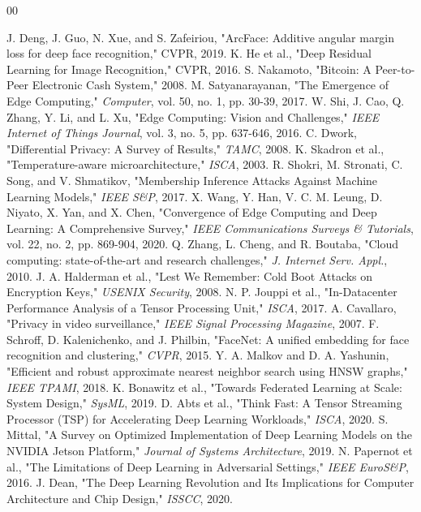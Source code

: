 \documentclass[conference]{IEEEtran}
\begin{document}
\begin{thebibliography}{00}

 J. Deng, J. Guo, N. Xue, and S. Zafeiriou, "ArcFace: Additive angular margin loss for deep face recognition," CVPR, 2019.
 K. He et al., "Deep Residual Learning for Image Recognition," CVPR, 2016.
 S. Nakamoto, "Bitcoin: A Peer-to-Peer Electronic Cash System," 2008.
 M. Satyanarayanan, "The Emergence of Edge Computing," \textit{Computer}, vol. 50, no. 1, pp. 30-39, 2017.
 W. Shi, J. Cao, Q. Zhang, Y. Li, and L. Xu, "Edge Computing: Vision and Challenges," \textit{IEEE Internet of Things Journal}, vol. 3, no. 5, pp. 637-646, 2016.
 C. Dwork, "Differential Privacy: A Survey of Results," \textit{TAMC}, 2008.
 K. Skadron et al., "Temperature-aware microarchitecture," \textit{ISCA}, 2003.
 R. Shokri, M. Stronati, C. Song, and V. Shmatikov, "Membership Inference Attacks Against Machine Learning Models," \textit{IEEE S\&P}, 2017.
 X. Wang, Y. Han, V. C. M. Leung, D. Niyato, X. Yan, and X. Chen, "Convergence of Edge Computing and Deep Learning: A Comprehensive Survey," \textit{IEEE Communications Surveys \& Tutorials}, vol. 22, no. 2, pp. 869-904, 2020.
 Q. Zhang, L. Cheng, and R. Boutaba, "Cloud computing: state-of-the-art and research challenges," \textit{J. Internet Serv. Appl.}, 2010.
 J. A. Halderman et al., "Lest We Remember: Cold Boot Attacks on Encryption Keys," \textit{USENIX Security}, 2008.
 N. P. Jouppi et al., "In-Datacenter Performance Analysis of a Tensor Processing Unit," \textit{ISCA}, 2017.
 A. Cavallaro, "Privacy in video surveillance," \textit{IEEE Signal Processing Magazine}, 2007.
 F. Schroff, D. Kalenichenko, and J. Philbin, "FaceNet: A unified embedding for face recognition and clustering," \textit{CVPR}, 2015.
 Y. A. Malkov and D. A. Yashunin, "Efficient and robust approximate nearest neighbor search using HNSW graphs," \textit{IEEE TPAMI}, 2018.
 K. Bonawitz et al., "Towards Federated Learning at Scale: System Design," \textit{SysML}, 2019.
 D. Abts et al., "Think Fast: A Tensor Streaming Processor (TSP) for Accelerating Deep Learning Workloads," \textit{ISCA}, 2020.
 S. Mittal, "A Survey on Optimized Implementation of Deep Learning Models on the NVIDIA Jetson Platform," \textit{Journal of Systems Architecture}, 2019.
 N. Papernot et al., "The Limitations of Deep Learning in Adversarial Settings," \textit{IEEE EuroS\&P}, 2016.
 J. Dean, "The Deep Learning Revolution and Its Implications for Computer Architecture and Chip Design," \textit{ISSCC}, 2020.


\end{thebibliography}
\end{document}
